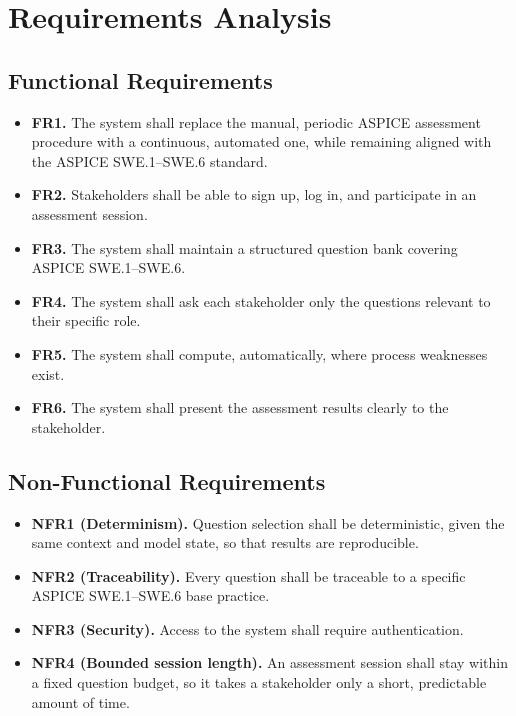 \documentclass[a4paper, 12pt, oneside, openany, BCOR1cm,toc=chapterentrywithdots]{scrbook}
\begin{document}
\section{Requirements Analysis}
\label{sec:requirements-analysis}

\subsection{Functional Requirements}

\begin{itemize}
  \item \textbf{FR1.} The system shall replace the manual, periodic ASPICE assessment
  procedure with a continuous, automated one, while remaining aligned with the ASPICE
  SWE.1--SWE.6 standard.
  \item \textbf{FR2.} Stakeholders shall be able to sign up, log in, and participate in an
  assessment session.
  \item \textbf{FR3.} The system shall maintain a structured question bank covering ASPICE
  SWE.1--SWE.6.
  \item \textbf{FR4.} The system shall ask each stakeholder only the questions relevant to
  their specific role.
  \item \textbf{FR5.} The system shall compute, automatically, where process weaknesses exist.
  \item \textbf{FR6.} The system shall present the assessment results clearly to the
  stakeholder.
\end{itemize}

\subsection{Non-Functional Requirements}

\begin{itemize}
  \item \textbf{NFR1 (Determinism).} Question selection shall be deterministic, given the same
  context and model state, so that results are reproducible.
  \item \textbf{NFR2 (Traceability).} Every question shall be traceable to a specific ASPICE
  SWE.1--SWE.6 base practice.
  \item \textbf{NFR3 (Security).} Access to the system shall require authentication.
  \item \textbf{NFR4 (Bounded session length).} An assessment session shall stay within a fixed
  question budget, so it takes a stakeholder only a short, predictable amount of time.
\end{itemize}
\end{document}
